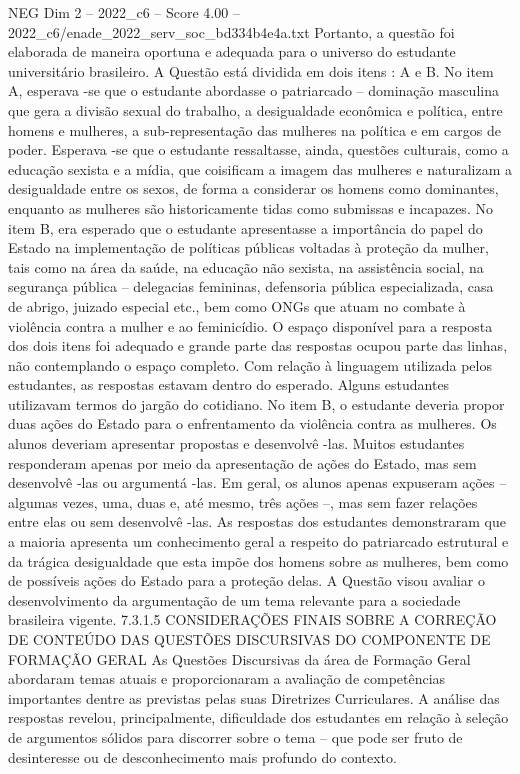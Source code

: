 \begin{textsample}{NEG Dim 2 – 2022\_c6 – Score 4.00 – 2022\_c6/enade\_2022\_serv\_soc\_bd334b4e4a.txt}
Portanto, a questão foi elaborada de maneira oportuna e adequada para o universo do estudante universitário brasileiro.
A Questão está dividida em dois itens : A e B.
No item A, esperava -se que o estudante abordasse o patriarcado – dominação masculina que gera a divisão sexual do trabalho, a desigualdade econômica e política, entre homens e mulheres, a sub-representação das mulheres na política e em cargos de poder.
Esperava -se que o estudante ressaltasse, ainda, questões culturais, como a educação sexista e a mídia, que coisificam a imagem das mulheres e naturalizam a desigualdade entre os sexos, de forma a considerar os homens como dominantes, enquanto as mulheres são historicamente tidas como submissas e incapazes.
No item B, era esperado que o estudante apresentasse a importância do papel do Estado na implementação de políticas públicas voltadas à proteção da mulher, tais como na área da saúde, na educação não sexista, na assistência social, na segurança pública – delegacias femininas, defensoria pública especializada, casa de abrigo, juizado especial etc., bem como ONGs que atuam no combate à violência contra a mulher e ao feminicídio.
O espaço disponível para a resposta dos dois itens foi adequado e grande parte das respostas ocupou parte das linhas, não contemplando o espaço completo.
Com relação à linguagem utilizada pelos estudantes, as respostas estavam dentro do esperado.
Alguns estudantes utilizavam termos do jargão do cotidiano.
No item B, o estudante deveria propor duas ações do Estado para o enfrentamento da violência contra as mulheres.
Os alunos deveriam apresentar propostas e desenvolvê -las.
Muitos estudantes responderam apenas por meio da apresentação de ações do Estado, mas sem desenvolvê -las ou argumentá -las.
Em geral, os alunos apenas expuseram ações – algumas vezes, uma, duas e, até mesmo, três ações –, mas sem fazer relações entre elas ou sem desenvolvê -las.
As respostas dos estudantes demonstraram que a maioria apresenta um conhecimento geral a respeito do patriarcado estrutural e da trágica desigualdade que esta impõe dos homens sobre as mulheres, bem como de possíveis ações do Estado para a proteção delas.
A Questão visou avaliar o desenvolvimento da argumentação de um tema relevante para a sociedade brasileira vigente. 7.3.1.5 CONSIDERAÇÕES FINAIS SOBRE A CORREÇÃO DE CONTEÚDO DAS QUESTÕES DISCURSIVAS DO COMPONENTE DE FORMAÇÃO GERAL As Questões Discursivas da área de Formação Geral abordaram temas atuais e proporcionaram a avaliação de competências importantes dentre as previstas pelas suas Diretrizes Curriculares.
A análise das respostas revelou, principalmente, dificuldade dos estudantes em relação à seleção de argumentos sólidos para discorrer sobre o tema – que pode ser fruto de desinteresse ou de desconhecimento mais profundo do contexto.

\end{textsample}
